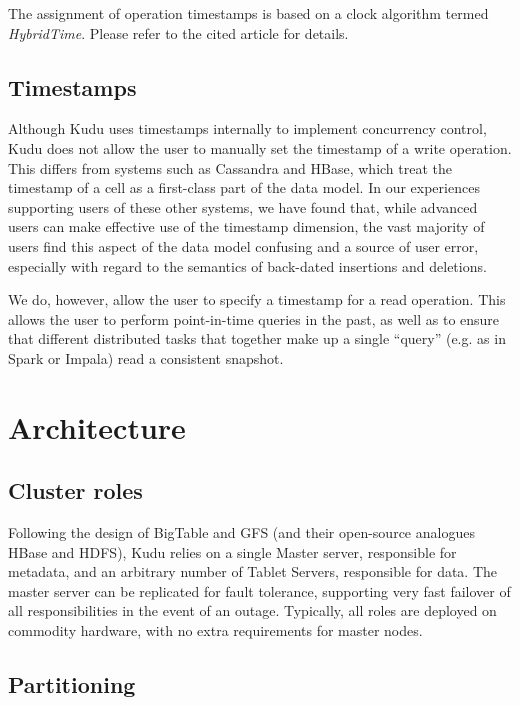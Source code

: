 \documentclass[twocolumn,9pt]{article}
\begin{document}
The assignment of operation timestamps is based on a clock algorithm termed {\em HybridTime}\cite{hybridtime}.
Please refer to the cited article for details.

\subsection{Timestamps}

Although Kudu uses timestamps internally to implement concurrency control, Kudu does not allow
the user to manually set the timestamp of a write operation. This differs from systems such as
Cassandra and HBase, which treat the timestamp of a cell as a first-class part of the data model.
In our experiences supporting users of these other systems, we have found that, while advanced users
can make effective use of the timestamp dimension, the vast majority of users find this aspect of the data model
confusing and a source of user error, especially with regard to the semantics of back-dated insertions and deletions.

We do, however, allow the user to specify a timestamp for a read operation. This allows the user to perform
point-in-time queries in the past, as well as to ensure that different distributed tasks that together
make up a single ``query'' (e.g. as in Spark or Impala) read a consistent snapshot.

\section{Architecture}
\label{sec:architecture}

\subsection{Cluster roles}

Following the design of BigTable and GFS\cite{gfs} (and their open-source analogues HBase and HDFS), Kudu
relies on a single Master server, responsible for metadata, and an arbitrary number of Tablet
Servers, responsible for data. The master server can be replicated for fault tolerance, supporting
very fast failover of all responsibilities in the event of an outage. Typically, all roles are deployed
on commodity hardware, with no extra requirements for master nodes.

\subsection{Partitioning}
\label{sec:partitioning}
\end{document}
